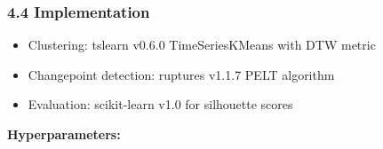 \subsubsection{4.4 Implementation}

\begin{itemize}
\item Clustering: tslearn v0.6.0 TimeSeriesKMeans with DTW metric
\item Changepoint detection: ruptures v1.1.7 PELT algorithm
\item Evaluation: scikit-learn v1.0 for silhouette scores
\end{itemize}

\textbf{Hyperparameters:}

\begin{table}[htbp]
\centering
{}
\end{table}
